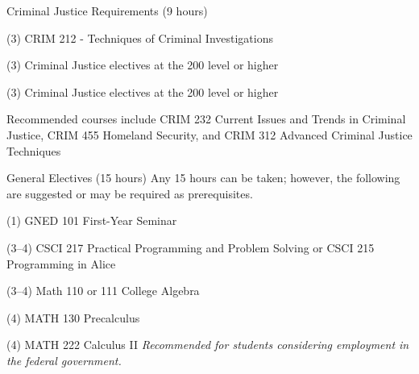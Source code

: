 \begin{reqgroup}{Criminal Justice Requirements (9 hours)}
\begin{checklist}
\begin{minipage}[t]{0.5\linewidth}
	\item (3) CRIM 212 - Techniques of Criminal Investigations
\end{minipage}
\begin{minipage}[t]{0.5\linewidth}
	\item (3) Criminal Justice electives at the 200 level or higher
	\item (3) Criminal Justice electives at the 200 level or higher
\end{minipage}
\end{checklist}
Recommended courses include CRIM 232 Current Issues and Trends in Criminal Justice,
CRIM 455 Homeland Security, and CRIM 312 Advanced Criminal Justice Techniques
\end{reqgroup}

\begin{reqgroup}{General Electives (15 hours)}
Any 15 hours can be taken; however, the following are suggested or may be required as prerequisites.
\begin{checklist}
\begin{minipage}[t]{\linewidth}
	\item (1)	GNED 101	First-Year Seminar
	\item (3--4)	CSCI 217	Practical Programming and Problem Solving or CSCI 215	Programming in Alice
	\item (3--4) Math 110 or 111 College Algebra
	\item (4) MATH 130 Precalculus
	\item (4) MATH 222 Calculus II \em{Recommended for students considering employment in the federal government.}
\end{minipage}
\end{checklist}
\end{reqgroup}

